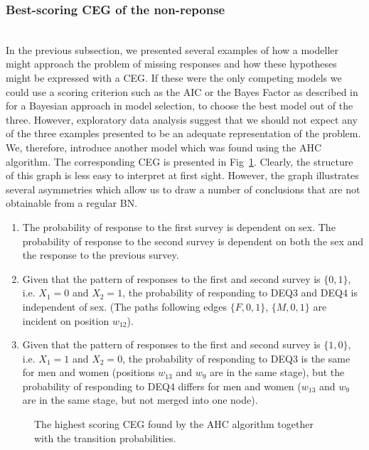 \documentclass[runningheads]{llncs}
\begin{document}
\subsubsection{Best-scoring CEG of the non-reponse}\label{subsubsec:best-fit-dropout}
\hfill\\
In the previous subsection, we presented several examples of how a modeller might approach the problem of missing responses and how these hypotheses might be expressed with a CEG. If these were the only competing models we could use a scoring criterion such as the AIC or the Bayes Factor as described in \cite{smith2017cegs} for a Bayesian approach in model selection, to choose the best model out of the three. However, exploratory data analysis suggest that we should not expect any of the three examples presented to be an adequate representation of the problem. We, therefore, introduce another model which was found using the AHC algorithm. The corresponding CEG is presented in Fig~\ref{ceg:ahc-responses}. Clearly, the structure of this graph is less easy to interpret at first sight. However, the graph illustrates several asymmetries which allow us to draw a number of conclusions that are not obtainable from a regular BN.
\begin{enumerate}[topsep=0pt]
    \item The probability of response to the first survey is dependent on sex. The probability of response to the second survey is dependent on both the sex and the response to the previous survey.
    \item Given that the pattern of responses to the first and second survey is $\{0, 1\}$, i.e. $X_1 = 0$ and $X_2 = 1$, the probability of responding to DEQ3 and DEQ4 is independent of sex. (The paths following edges $\{F, 0, 1\}$, $\{M, 0, 1\}$ are incident on position $w_{12}$).
    \item Given that the pattern of responses to the first and second survey is $\{1, 0\}$, i.e. $X_1 = 1$ and $X_2 = 0$, the probability of responding to DEQ3 is the same for men and women (positions $w_{13}$ and $w_{9}$ are in the same stage), but the probability of responding to DEQ4 differs for men and women ($w_{13}$ and $w_{9}$ are in the same stage, but not merged into one node).
\end{enumerate}
\begin{figure}
\centering

\vspace{1ex}
\caption{The highest scoring CEG found by the AHC algorithm together with the transition probabilities.}
\label{ceg:ahc-responses}
\end{figure}
\end{document}
